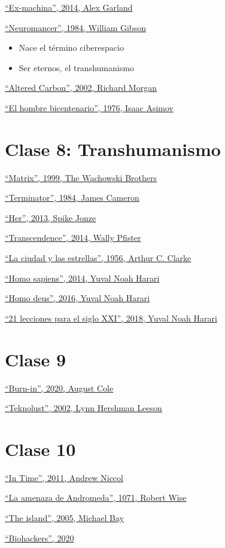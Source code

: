 \documentclass[12pt, twoside, openright]{report} %
\begin{document}
\underline{\enquote{Ex-machina}, 2014, Alex Garland}

\underline{\enquote{Neuromancer}, 1984, William Gibson}
\begin{itemize}
	\item Nace el término ciberespacio
	\item Ser eternos, el transhumanismo
\end{itemize}

\underline{\enquote{Altered Carbon}, 2002, Richard Morgan }

\underline{\enquote{El hombre bicentenario}, 1976, Isaac Asimov}

\chapter{Clase 8: Transhumanismo}
\underline{\enquote{Matrix}, 1999, The Wachowski Brothers}

\underline{\enquote{Terminator}, 1984, James Cameron}

\underline{\enquote{Her}, 2013, Spike Jonze}

\underline{\enquote{Transcendence}, 2014, Wally Pfister}

\underline{\enquote{La ciudad y las estrellas}, 1956, Arthur C. Clarke}

\underline{\enquote{Homo sapiens}, 2014, Yuval Noah Harari}

\underline{\enquote{Homo deus}, 2016, Yuval Noah Harari}

\underline{\enquote{21 lecciones para el siglo XXI}, 2018, Yuval Noah Harari}

\chapter{Clase 9}

\underline{\enquote{Burn-in}, 2020, August Cole}

\underline{\enquote{Teknolust}, 2002, Lynn Hershman Leeson}

\chapter{Clase 10}
\underline{\enquote{In Time}, 2011, Andrew Niccol}

\underline{\enquote{La amenaza de Andromeda}, 1071, Robert Wise}

\underline{\enquote{The island}, 2005, Michael Bay}

\underline{\enquote{Biohackers}, 2020}
\end{document}
